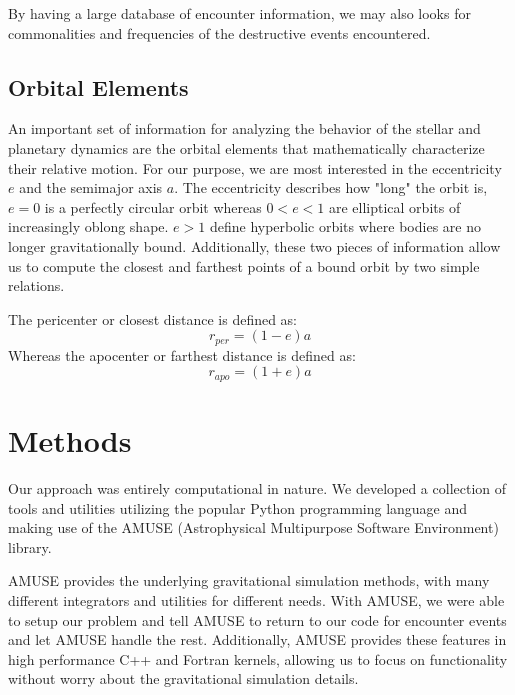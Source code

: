 \documentclass[12pt]{article}
\begin{document}
By having a large database of encounter information, we may also looks for commonalities
and frequencies of the destructive events encountered. 


\subsection{Orbital Elements}

    An important set of information for analyzing the behavior of the stellar and
    planetary dynamics are the orbital elements that mathematically 
    characterize their relative motion. 
    For our purpose, we are most interested in the eccentricity $e$ and the
    semimajor axis $a$. The eccentricity describes how "long" the orbit is, $e=0$
    is a perfectly circular orbit whereas $0<e<1$ are elliptical orbits of increasingly
    oblong shape. $e>1$ define hyperbolic orbits where bodies are no longer
    gravitationally bound. Additionally, these two pieces of information allow us to 
    compute the closest and farthest points of a bound orbit by two simple relations.

    The pericenter or closest distance is defined as:
    \begin{equation}
        r_{per} = (1 - e) a
    \end{equation}
    Whereas the apocenter or farthest distance is defined as:
    \begin{equation}
        r_{apo} = (1 + e) a
    \end{equation}


\section{Methods}

    Our approach was entirely computational in nature. We developed a collection of tools
    and utilities utilizing the popular Python programming language and making use
    of the AMUSE (Astrophysical Multipurpose Software Environment) library. 

    AMUSE provides the underlying gravitational simulation methods, with many different
    integrators and utilities for different needs. With AMUSE, we were able to 
    setup our problem and tell AMUSE to return to our code for encounter events and
    let AMUSE handle the rest. Additionally, AMUSE provides these features in high
    performance C++ and Fortran kernels, allowing us to focus on functionality without
    worry about the gravitational simulation details.
\end{document}
